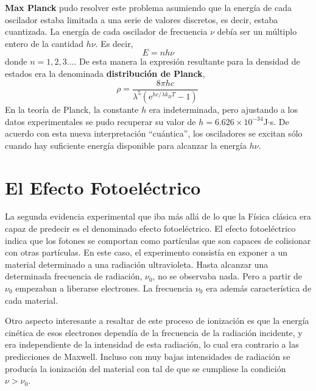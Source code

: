 \textbf{Max Planck} pudo resolver este problema asumiendo que la
energía
de cada oscilador estaba limitada a una serie de valores discretos,
es decir, estaba cuantizada. La energía de cada oscilador de 
frecuencia $\nu$ debía ser un múltiplo entero de la cantidad
$h\nu$. Es decir, 
\begin{equation}
E=nh\nu
\end{equation}
donde $n=1,2,3...$. De esta manera la expresión resultante
para la densidad de estados era la denominada \textbf{distribución
de Planck},
\begin{equation}
    \rho=\frac{8\pi h c}{\lambda^5(\mathrm{e}^{hc/\lambda k_BT}-1)}\
\label{eq:planck}
\end{equation}
En la teoría de Planck, la constante $h$ era indeterminada,
pero ajustando a los datos experimentales se pudo recuperar 
su valor de $h=6.626\times 10^{-34}$J$\cdot$s. De acuerdo con
esta nueva interpretación ``cuántica'', los osciladores se 
excitan sólo cuando hay suficiente energía disponible para 
alcanzar la energía $h\nu$.

\section{El Efecto Fotoeléctrico}
La segunda evidencia experimental que iba más allá de lo que la 
Física clásica era capaz de predecir es el denominado efecto
fotoeléctrico. El efecto fotoeléctrico indica que los fotones
se comportan como partículas que son capaces de colisionar
con otras partículas. 
En este caso, el experimento consistía en 
exponer a un material determinado a una radiación ultravioleta.
Hasta alcanzar una determinada frecuencia de radiación, $\nu_0$, 
no se observaba nada. Pero a partir de $\nu_0$ empezaban a 
liberarse electrones. La frecuencia $\nu_0$ era además 
característica de cada material.

Otro aspecto
interesante a resaltar de este proceso de ionización es que la
energía cinética de esos electrones dependía de la frecuencia
de la radiación incidente, y era independiente de la intensidad
de esta radiación, lo cual era contrario a las predicciones de
Maxwell. Incluso con muy bajas intensidades de radiación
se producía la ionización del material con tal de que se cumpliese
la condici\'on $\nu>\nu_0$.

